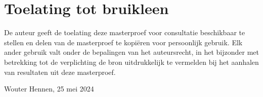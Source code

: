 \chapter*{Toelating tot bruikleen}
De auteur geeft de toelating deze masterproef voor consultatie beschikbaar te stellen en delen van de masterproef te kopiëren voor persoonlijk gebruik. Elk ander gebruik valt onder de bepalingen van het auteursrecht, in het bijzonder met betrekking tot de verplichting de bron uitdrukkelijk te vermelden bij het aanhalen van resultaten uit deze masterproef.


Wouter Hennen, 25 mei 2024

